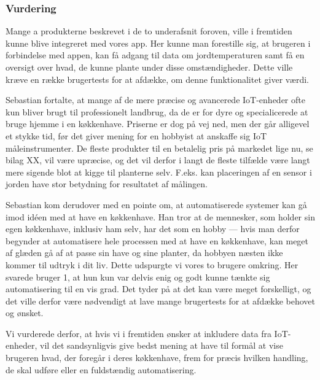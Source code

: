 \subsubsection*{Vurdering}
Mange a produkterne beskrevet i de to underafsnit foroven, ville i fremtiden kunne blive integreret med vores app. Her kunne man forestille sig, at brugeren i forbindelse med appen, kan få adgang til data om jordtemperaturen samt få en oversigt over hvad, de kunne plante under disse omstændigheder. Dette ville kræve en række brugertests for at afdække, om denne funktionalitet giver værdi.

Sebastian fortalte, at mange af de mere præcise og avancerede IoT-enheder ofte kun bliver brugt til professionelt landbrug, da de er for dyre og specialicerede at bruge hjemme i en køkkenhave. Priserne er dog på vej ned, men der går alligevel et stykke tid, før det giver mening for en hobbyist at anskaffe sig IoT måleinstrumenter. De fleste produkter til en betalelig pris på markedet lige nu, se bilag XX, vil være upræcise, og det vil derfor i langt de fleste tilfælde være langt mere sigende blot at kigge til planterne selv. F.eks. kan placeringen af en sensor i jorden have stor betydning for resultatet af målingen.

Sebastian kom derudover med en pointe om, at automatiserede systemer kan gå imod idéen med at have en køkkenhave. Han tror at de mennesker, som holder sin egen køkkenhave, inklusiv ham selv, har det som en hobby --- hvis man derfor begynder at automatisere hele processen med at have en køkkenhave, kan meget af glæden gå af at passe sin have og sine planter, da hobbyen næsten ikke kommer til udtryk i dit liv. Dette udspurgte vi vores to brugere omkring. Her svarede bruger 1, at hun kun var delvis enig og godt kunne tænkte sig automatisering til en vis grad. Det tyder på at det kan være meget forskelligt, og det ville derfor være nødvendigt at lave mange brugertests for at afdække behovet og ønsket.

Vi vurderede derfor, at hvis vi i fremtiden ønsker at inkludere data fra IoT-enheder, vil det sandsynligvis give bedst mening at have til formål at vise brugeren hvad, der foregår i deres køkkenhave, frem for præcis hvilken handling, de skal udføre eller en fuldstændig automatisering.

